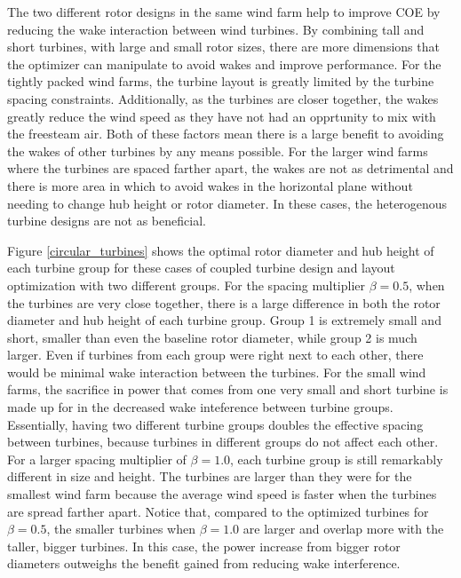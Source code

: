 The two different rotor designs in the same wind farm help to improve COE by reducing the wake interaction between wind turbines. By combining tall and short turbines, with large and small rotor sizes, there are more dimensions that the optimizer can manipulate to avoid wakes and improve performance. For the tightly packed wind farms, the turbine layout is greatly limited by the turbine spacing constraints. Additionally, as the turbines are closer together, the wakes greatly reduce the wind speed as they have not had an opprtunity to mix with the freesteam air. Both of these factors mean there is a large benefit to avoiding the wakes of other turbines by any means possible. For the larger wind farms where the turbines are spaced farther apart, the wakes are not as detrimental and there is more area in which to avoid wakes in the horizontal plane without needing to change hub height or rotor diameter. In these cases, the heterogenous turbine designs are not as beneficial.

Figure \ref{circular_turbines} shows the optimal rotor diameter and hub height of each turbine group for these cases of coupled turbine design and layout optimization with two different groups. For the spacing multiplier $\beta=0.5$, when the turbines are very close together, there is a large difference in both the rotor diameter and hub height of each turbine group. Group 1 is extremely small and short, smaller than even the baseline rotor diameter, while group 2 is much larger. Even if turbines from each group were right next to each other, there would be minimal wake interaction between the turbines. For the small wind farms, the sacrifice in power that comes from one very small and short turbine is made up for in the decreased wake inteference between turbine groups. Essentially, having two different turbine groups doubles the effective spacing between turbines, because turbines in different groups do not affect each other. For a larger spacing multiplier of $\beta=1.0$, each turbine group is still remarkably different in size and height. The turbines are larger than they were for the smallest wind farm because the average wind speed is faster when the turbines are spread farther apart. Notice that, compared to the optimized turbines for $\beta=0.5$, the smaller turbines when $\beta=1.0$ are larger and overlap more with the taller, bigger turbines. In this case, the power increase from bigger rotor diameters outweighs the benefit gained from reducing wake interference. 

